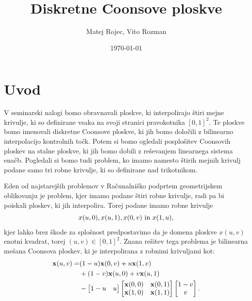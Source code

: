 \documentclass[a4paper,12pt]{article}
\begin{document}
\newcommand{\N}{\mathbb{N}}
\newcommand{\R}{\mathbb{R}}
\newcommand\sbullet[1][.5]{\mathbin{\vcenter{\hbox{\scalebox{#1}{$\bullet$}}}}}
\newtheorem{definicija}{Definicija}[section]
\newtheorem{primer}[definicija]{Primer}
\newtheorem{opomba}[definicija]{Opomba}

\title{Diskretne Coonsove ploskve}
\author{Matej Rojec, Vito Rozman}
\date{\today}

\maketitle

\newpage

\tableofcontents
\listoffigures

\newpage

\section{Uvod}

V seminarski nalogi bomo obravnavali ploskve, ki interpolirajo štiri mejne krivulje,
ki so definirane vsaka na svoji stranici pravokotnika $[0,1]^2$. 
Te ploskve bomo imenovali diskretne Coonsove ploskve, 
ki jih bomo določili z bilinearno interpolacijo kontrolnih točk.
Potem si bomo ogledali posplošitev
Coonsovih ploskev na stalne ploskve, ki jih bomo dobili 
z reševanjem linearnega sistema enačb. Pogledali si bomo tudi problem, ko imamo namesto štirih mejnih 
krivulj podane samo tri robne krivulje, ki so definirane nad trikotnikom.

Eden od najstarejših problemov v Računalniško podprtem geometrijskem oblikovanju je problem, 
kjer imamo podane štiri robne krivulje, radi pa bi poiskali ploskev, ki jih interpolira. 
Torej podane imamo robne krivulje $$x(u,0), x(u,1), x(0,v) ~\textnormal{in}~  x(1,u),$$ kjer lahko brez škode za 
splošnost predpostavimo da je domena ploskve $x(u,v)$ enotni kvadrat, torej $(u,v) \in [0,1]^2$. 
Znana rešitev tega problema je bilinearna mešana Coonsova ploskev, ki je interpolirana z robnimi 
krivuljami kot:
\begin{align}
   \label{continiusCons}
   \mathbf{x}(u,v) =& (1-u)\mathbf{x}(0,v) +u\mathbf{x}(1,v) \notag \\
    & + (1-v)\mathbf{x}(u,0) +v\mathbf{x}(u,1)   \\
   & - 
   \begin{bmatrix} 
      1-u & u 
   \end{bmatrix}
   \begin{bmatrix} 
      \mathbf{x}(0,0)& \mathbf{x}(0,1) \notag \\
      \mathbf{x}(1,0)& \mathbf{x}(1,1) 
   \end{bmatrix}
   \begin{bmatrix}
      1-v\\
      v
   \end{bmatrix}.
\end{align}
\end{document}
